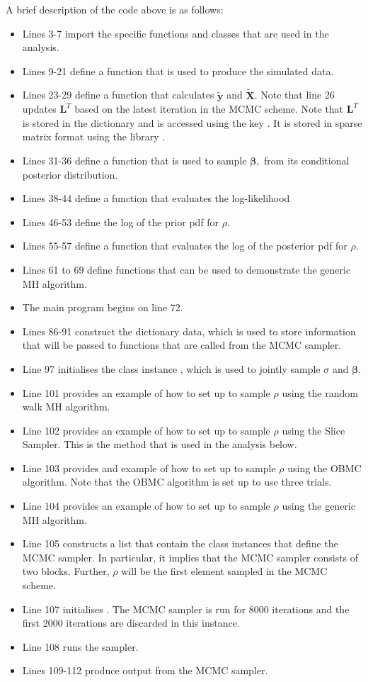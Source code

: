 \documentclass[article]{jss}
\begin{document}
A brief description of the code above is as follows: 
\begin{itemize}
\item Lines 3-7 import the specific functions and classes that are used
in the analysis. 
\item Lines 9-21 define a function that is used to produce the simulated
data. 
\item Lines 23-29 define a function that calculates $\tilde{\bm{y}}$
  and $\bm{\tilde{X}}.$ Note that line 26 updates $\bm{L}^{T}$ based
  on the latest iteration in the MCMC scheme. Note that $\bm{L}^{T}$
  is stored in the  dictionary  and is
  accessed using the key . It is stored in sparse matrix format
  using the library .
\item Lines 31-36 define a function that is used to sample $\bm{\beta},$
from its conditional posterior distribution.
\item Lines 38-44 define a function that evaluates the log-likelihood
\item Lines 46-53 define the log of the prior pdf for $\rho$.
\item Lines 55-57 define a function that evaluates the log of the posterior
pdf for $\rho.$
\item Lines 61 to 69 define functions that can be used to demonstrate
  the generic MH algorithm.
\item The main program begins on line 72.
\item Lines 86-91 construct the  dictionary data, which is used to
store information that will be passed to functions that are called
from the MCMC sampler.
\item Line 97 initialises the class instance , which is
used to jointly sample $\sigma$ and $\bm{\beta}.$ 
\item Line 101 provides an example of how to set up  to sample $\rho$
using the random walk MH algorithm.
\item Line 102 provides an example of how to set up  to sample $\rho$
using the Slice Sampler. This is the method that is used in the analysis
below.
\item Line 103 provides and example of how to set up  to sample $\rho$
using the OBMC algorithm. Note that the OBMC algorithm is set up to
use three trials.
\item Line 104 provides an example of how to set up  to sample $\rho$
using the generic MH algorithm.
\item Line 105 constructs a  list that contain the class instances
that define the MCMC sampler. In particular, it implies that the MCMC
sampler consists of two blocks. Further, $\rho$ will be the first
element sampled in the MCMC scheme. 
\item Line 107 initialises . The MCMC sampler is run for 8000
iterations and the first 2000 iterations are discarded in this instance.
\item Line 108 runs the sampler.
\item Lines 109-112 produce output from the MCMC sampler.
\end{itemize}
\end{document}
